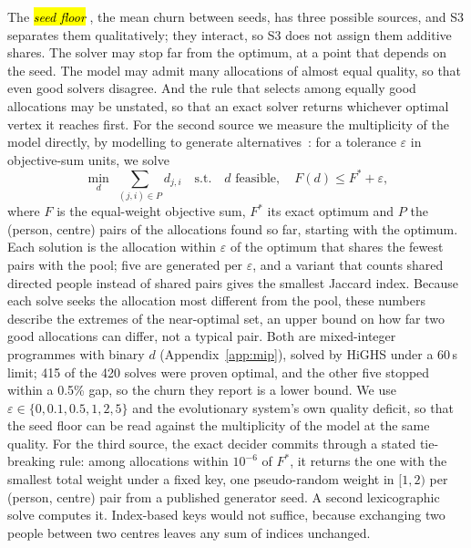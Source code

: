 \documentclass[systems,article,accept,moreauthors,pdftex]{Definitions/mdpi}
\begin{document}
The \emph{\hl{seed floor}%
}, the mean churn between seeds, has three possible sources, and S3
separates them qualitatively; they interact, so S3 does not assign them additive shares. The solver may stop far from the optimum, at a point that depends on the
seed. The model may admit many allocations of almost equal quality, so that even good
solvers disagree. And the rule that selects among equally good allocations may be unstated,
so that an exact solver returns whichever optimal vertex it reaches first. For the second
source we measure the multiplicity of the model directly, by modelling to generate
alternatives~\cite{brill1982mga}: for a tolerance $\varepsilon$ in objective-sum units, we
solve
\begin{equation}
\min_{d}\; \sum_{(j,i) \in P} d_{j,i}
\quad\text{s.t.}\quad d \text{ feasible},\quad F(d) \le F^\ast + \varepsilon,
\label{eq:mga}
\end{equation}
where $F$ is the equal-weight objective sum, $F^\ast$ its exact optimum and $P$ the
(person, centre) pairs of the allocations found so far, starting with the optimum. Each
solution is the allocation within $\varepsilon$ of the optimum that shares the fewest pairs
with the pool; five are generated per $\varepsilon$, and a variant that counts shared
directed people instead of shared pairs gives the smallest Jaccard index. Because each solve
seeks the allocation most different from the pool, these numbers describe the extremes of the
near-optimal set, an upper bound on how far two good allocations can differ, not a typical
pair. Both are
mixed-integer programmes with binary $d$ (Appendix~\ref{app:mip}), solved by HiGHS under a
60\,s limit; 415 of the 420 solves were proven optimal, and the other five stopped within a
0.5\% gap, so the churn they report is a lower bound. We use $\varepsilon \in \{0, 0.1, 0.5, 1, 2, 5\}$ and
the evolutionary system's own quality deficit, so that the seed floor can be read against the
multiplicity of the model at the same quality. For the third source, the exact decider
commits through a stated tie-breaking rule: among allocations within $10^{-6}$ of $F^\ast$, it
returns the one with the smallest total weight under a fixed key, one pseudo-random weight in
$[1, 2)$ per (person, centre) pair from a published generator seed. A second lexicographic
solve computes it. Index-based keys would not suffice, because exchanging two people between
two centres leaves any sum of indices unchanged.
\end{document}
